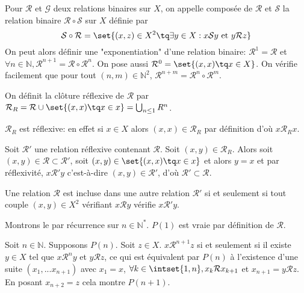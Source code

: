 \documentclass{scrartcl}
\begin{document}
			\semidef Pour $\mathcal{R}$ et $\mathcal{G}$ deux relations binaires sur $X$,
				on appelle composée de $\mathcal{R}$ et $\mathcal{S}$ la relation binaire $\mathcal{R} \circ \mathcal{S}$ sur $X$ 
				définie par
				\[
					\mathcal{S} \circ \mathcal{R} = \set{(x,z) \in X^2 \tq \exists y \in X: x \mathcal{S} y \text{ et } y \mathcal{R} z}
				\]
				On peut alors définir une "exponentiation" d'une relation binaire: 
				$\mathcal{R}^1 = \mathcal{R}$ et $\forall n \in \mathbb{N}, \mathcal{R}^{n+1} = \mathcal{R} \circ \mathcal{R}^n$.
				On pose aussi $\mathcal{R}^0 = \set{(x,x) \tq x \in X}$.
				On vérifie facilement que pour tout $(n,m) \in \mathbb{N}^2$, $\mathcal{R}^{n+m} = \mathcal{R}^n\circ\mathcal{R}^m$.

			\semidef On définit la clôture réflexive de $\mathcal{R}$ par $\mathcal{R}_R = \mathcal{R} \cup \set{(x,x) \tq x \in x} = \bigcup_{n \leq 1} R^n$.

			\begin{demo}
				\item $\mathcal{R}_R$ est réflexive: en effet si $x \in X$ alors $(x,x) \in \mathcal{R}_R$ par définition d'où $x \mathcal{R}_R x$.
				\item Soit $\mathcal{R}'$ une relation réflexive contenant $\mathcal{R}$.
					Soit $(x,y) \in \mathcal{R}_R$. Alors soit $(x,y) \in \mathcal{R} \subset \mathcal{R}'$, 
					soit $(x,y) \in \set{(x,x) \tq x \in x}$ et alors $y=x$ et par réflexivité, 
					$x \mathcal{R}' y$ c'est-à-dire $(x,y) \in \mathcal{R}'$, d'où $\mathcal{R}' \subset \mathcal{R}$.
			\end{demo}

			\rem Une relation $\mathcal{R}$ est incluse dans une autre relation $\mathcal{R}'$ si et seulement si
				tout couple $(x,y) \in X^2$ vérifiant $x \mathcal{R} y$ vérifie $x \mathcal{R'} y$.

			\begin{demo}
				\item Montrons le par récurrence sur $n \in \mathbb{N}^*$. $P(1)$ est vraie par définition de $\mathcal{R}$.
				\item Soit $n \in \mathbb{N}$. Supposons $P(n)$.
					Soit $z \in X$. $x \mathcal{R}^{n+1}z$ si et seulement si il existe $y \in X$ tel que $x \mathcal{R}^n y$ et $y \mathcal{R}z$,
					ce qui est équivalent par $P(n)$ à l'existence d'une suite $(x_1,...x_{n+1})$ 
					avec $x_1 = x$, $\forall k \in \intset{1,n}, x_k \mathcal{R} x_{k+1}$ et $x_{n+1} = y \mathcal{R} z$.
					En posant $x_{n+2} = z$ cela montre $P(n+1)$.
			\end{demo}
\end{document}
